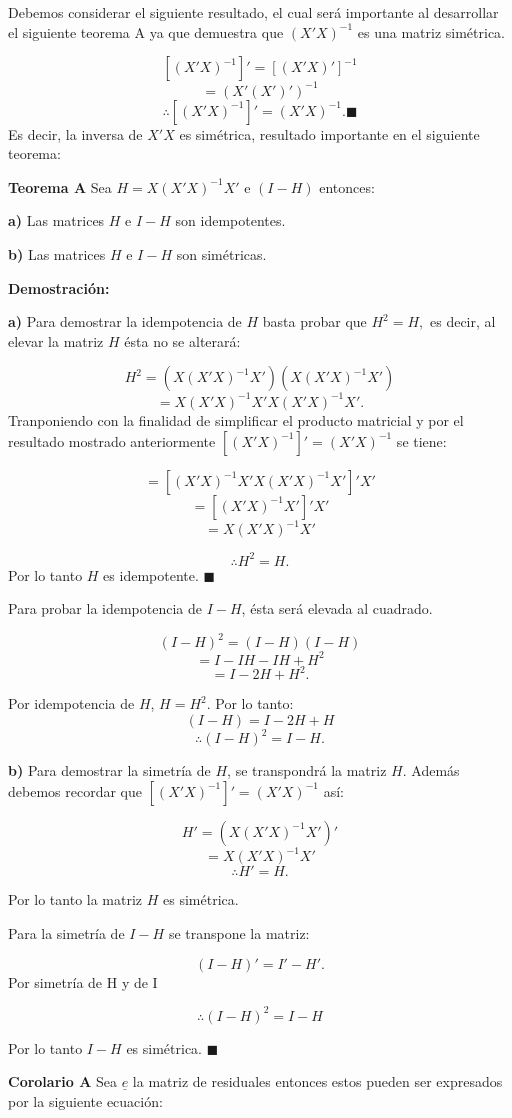 \documentclass[a4paper,oneside,openany]{book}
\begin{document}
Debemos considerar el siguiente resultado, el cual será importante al
desarrollar el siguiente teorema A ya que demuestra que \((X'X)^{-1}\)
es una matriz simétrica.

\[[(X'X)^{-1}]'=[(X'X)']^{-1}\] \[=(X'(X')')^{-1}\]
\[\therefore [(X'X)^{-1}]'= (X'X)^{-1}. \blacksquare\] Es decir, la
inversa de \(X'X\) es simétrica, resultado importante en el siguiente
teorema:

\textbf{Teorema A} Sea \(H=X(X'X)^{-1}X'\) e \((I-H)\) entonces:

\textbf{a)} Las matrices \(H\) e \(I-H\) son idempotentes.

\textbf{b)} Las matrices \(H\) e \(I-H\) son simétricas.

\textbf{Demostración:}

\textbf{a)} Para demostrar la idempotencia de \(H\) basta probar que
\(H^2=H,\) es decir, al elevar la matriz \(H\) ésta no se alterará:

\[H^2=(X(X'X)^{-1}X')(X(X'X)^{-1}X')\] \[=X(X'X)^{-1}X'X(X'X)^{-1}X'.\]
Tranponiendo con la finalidad de simplificar el producto matricial y por
el resultado mostrado anteriormente \([(X'X)^{-1}]'=(X'X)^{-1}\) se
tiene:

\[=[(X'X)^{-1}X'X(X'X)^{-1}X']'X'\] \[=[(X'X)^{-1}X']'X'\]
\[=X(X'X)^{-1}X'\]

\[\therefore H^2=H.\] Por lo tanto \(H\) es idempotente.
\(\blacksquare\)

Para probar la idempotencia de \(I-H\), ésta será elevada al cuadrado.

\[(I-H)^2=(I-H)(I-H)\] \[=I-IH-IH+H^2\] \[=I-2H+H^2.\]

Por idempotencia de \(H\), \(H=H^2\). Por lo tanto: \[(I-H)=I-2H+H\]
\[\therefore (I-H)^2=I-H.\]

\textbf{b)} Para demostrar la simetría de \(H\), se transpondrá la
matriz \(H\). Además debemos recordar que \([(X'X)^{-1}]'=(X'X)^{-1}\)
así:

\[H'= (X(X'X)^{-1}X')'\] \[=X(X'X)^{-1}X'\] \[\therefore H'= H.\]

Por lo tanto la matriz \(H\) es simétrica.

Para la simetría de \(I-H\) se transpone la matriz:

\[(I-H)'=I'-H'.\] Por simetría de H y de I

\[\therefore (I-H)^2=I-H\]

Por lo tanto \(I-H\) es simétrica. \(\blacksquare\)

\textbf{Corolario A} Sea \(\underline{e}\) la matriz de residuales
entonces estos pueden ser expresados por la siguiente ecuación:
\end{document}
